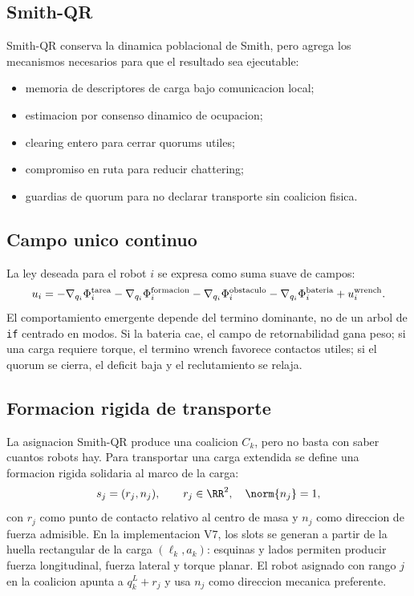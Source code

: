 \subsection{Smith-QR}

Smith-QR conserva la dinamica poblacional de Smith, pero agrega los mecanismos necesarios
para que el resultado sea ejecutable:
\begin{itemize}[leftmargin=2em]
  \item memoria de descriptores de carga bajo comunicacion local;
  \item estimacion por consenso dinamico de ocupacion;
  \item clearing entero para cerrar quorums utiles;
  \item compromiso en ruta para reducir chattering;
  \item guardias de quorum para no declarar transporte sin coalicion fisica.
\end{itemize}

\subsection{Campo unico continuo}

La ley deseada para el robot $i$ se expresa como suma suave de campos:
\[
  u_i =
  -\nabla_{q_i}\Phi_i^{\rm tarea}
  -\nabla_{q_i}\Phi_i^{\rm formacion}
  -\nabla_{q_i}\Phi_i^{\rm obstaculo}
  -\nabla_{q_i}\Phi_i^{\rm bateria}
  + u_i^{\rm wrench}.
\]
El comportamiento emergente depende del termino dominante, no de un arbol de \texttt{if}
centrado en modos. Si la bateria cae, el campo de retornabilidad gana peso; si una carga
requiere torque, el termino wrench favorece contactos utiles; si el quorum se cierra, el
deficit baja y el reclutamiento se relaja.

\subsection{Formacion rigida de transporte}

La asignacion Smith-QR produce una coalicion $C_k$, pero no basta con saber cuantos robots
hay. Para transportar una carga extendida se define una formacion rigida solidaria al
marco de la carga:
\[
  s_j = (r_j,n_j), \qquad r_j \in \RR^2,\quad \norm{n_j}=1,
\]
con $r_j$ como punto de contacto relativo al centro de masa y $n_j$ como direccion de
fuerza admisible. En la implementacion V7, los slots se generan a partir de la huella
rectangular de la carga $(\ell_k,a_k)$: esquinas y lados permiten producir fuerza
longitudinal, fuerza lateral y torque planar. El robot asignado con rango $j$ en la
coalicion apunta a $q_k^L+r_j$ y usa $n_j$ como direccion mecanica preferente.

